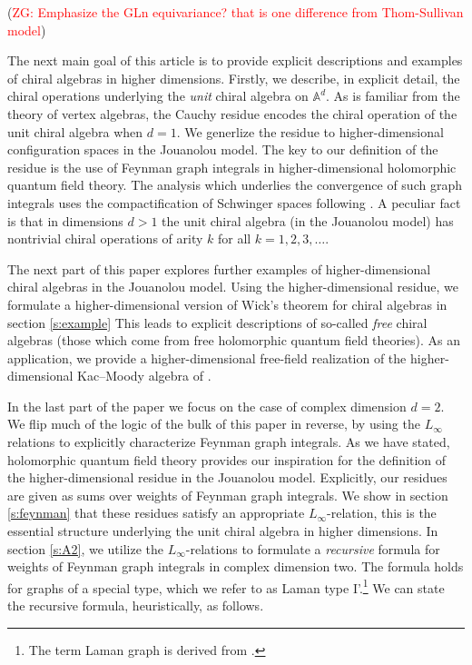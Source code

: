\documentclass[11pt]{amsart}
\theoremstyle{definition}
\theoremstyle{remark}
\numberwithin{equation}{section}
\newcommand{\Gui}[1]{(\textcolor{red}{ZG: #1})}
\begin{document}
\Gui{Emphasize the GLn equivariance? that is one difference from Thom-Sullivan model}

The next main goal of this article is to provide explicit descriptions and examples of chiral algebras in higher dimensions.
Firstly, we describe, in explicit detail, the chiral operations underlying the \textit{unit} chiral algebra on $\mathbb{A}^d$.
As is familiar from the theory of vertex algebras, the Cauchy residue encodes the chiral operation of the unit chiral algebra
when $d=1$.
We generlize the residue to higher-dimensional configuration spaces in the Jouanolou model.
The key to our definition of the residue is the use of Feynman graph integrals in higher-dimensional holomorphic quantum field theory.
The analysis which underlies the convergence of such graph integrals uses the compactification of Schwinger spaces
following \cite{wang2024feynman}.
A peculiar fact is that in dimensions $d > 1$ the unit chiral algebra (in the Jouanolou model) has nontrivial chiral
operations of arity $k$ for all $k = 1,2,3,\ldots$.

The next part of this paper explores further examples of higher-dimensional chiral algebras in the Jouanolou model.
Using the higher-dimensional residue, we formulate a higher-dimensional version of Wick's theorem for
chiral algebras in section \ref{s:example}
This leads to explicit descriptions of so-called \textit{free} chiral algebras (those which come from free holomorphic
quantum field theories).
As an application, we provide a higher-dimensional free-field realization of the higher-dimensional Kac--Moody algebra
of \cite{FHK}.

In the last part of the paper we focus on the case of complex dimension $d=2$.
We flip much of the logic of the bulk of this paper in reverse, by using the $L_\infty$ relations to explicitly
characterize Feynman graph integrals.
As we have stated, holomorphic quantum field theory provides our inspiration for the definition of the higher-dimensional residue in
the Jouanolou model.
Explicitly, our residues are given as sums over weights of Feynman graph integrals.
We show in section \ref{s:feynman} that these residues satisfy an appropriate $L_\infty$-relation, this is the essential
structure underlying the unit chiral algebra in higher dimensions.
In section \ref{s:A2}, we utilize the $L_\infty$-relations to formulate a \textit{recursive} formula for weights
of Feynman graph integrals in complex dimension two.
The formula holds for graphs of a special type, which we refer to as Laman type I'.\footnote{The term Laman graph is derived
from \cite{Laman1970OnGA}.}
We can state the recursive formula, heuristically, as follows.
\end{document}
